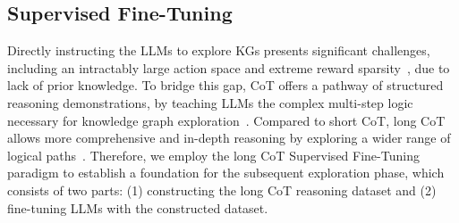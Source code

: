 
\subsection{Supervised Fine-Tuning}
\label{subsec:longcot}
Directly instructing the LLMs to explore KGs presents significant challenges, including an intractably large action space and extreme reward sparsity~\citep{xiong-etal-2017-deeppath,LinRX2018:MultiHopKG}, due to lack of prior knowledge.
To bridge this gap, CoT offers a pathway of structured reasoning demonstrations, by teaching LLMs the complex multi-step logic necessary for knowledge graph exploration~\citep{wu2024cotkr}.
Compared to short CoT, long CoT allows more comprehensive and in-depth reasoning by exploring a wider range of logical paths~\citep{chen2025towards}.
Therefore,  we employ the long CoT Supervised Fine-Tuning paradigm to establish a foundation for the subsequent exploration phase, which consists of two parts: (1) constructing the long CoT reasoning dataset and (2) fine-tuning LLMs with the constructed dataset.
 

